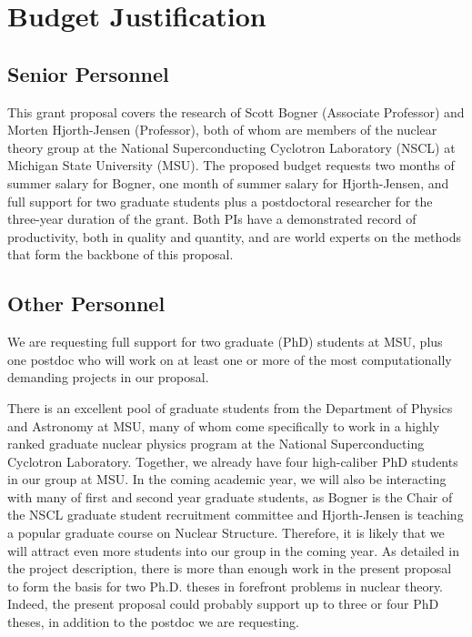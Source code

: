 \newpage



\section{Budget Justification}

%
\subsection{Senior Personnel}

This grant proposal covers the research of Scott Bogner (Associate Professor) and Morten Hjorth-Jensen (Professor), both of whom are members of the nuclear theory group at the National Superconducting Cyclotron Laboratory (NSCL) at Michigan State University (MSU). The proposed budget requests two months of summer salary for Bogner, one month of summer salary for Hjorth-Jensen, and full support for two graduate students plus a postdoctoral researcher for the three-year duration of the grant. Both PIs have a demonstrated record of productivity, both in quality and quantity, and are world experts on the methods that form the backbone of this proposal. 

\subsection{Other Personnel} 

We are requesting full support for two graduate (PhD) students at MSU, plus one postdoc who will work on at least one or more of the most computationally demanding projects in our proposal.  
    
There is an excellent pool of graduate students from the Department of Physics and Astronomy at MSU, many of whom come specifically to work in a highly ranked graduate nuclear physics program at the National Superconducting Cyclotron Laboratory. Together, we already have four high-caliber PhD students in our group at MSU.  In the coming academic year, we will also be interacting with many of first and second year graduate students, as Bogner is the Chair of the NSCL graduate student recruitment committee and  Hjorth-Jensen is teaching a popular graduate course on Nuclear Structure.  Therefore, it is likely that we will attract even more students into our group in the coming year.  As detailed in the project description, there is more than enough work in the present proposal to form the basis for two Ph.D. theses in forefront problems in nuclear theory. Indeed, the present proposal could probably support up to three or four PhD theses, in addition to the postdoc we are requesting.

